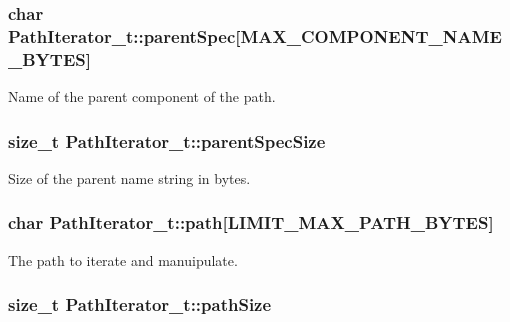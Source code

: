 \subsubsection[{\texorpdfstring{parent\+Spec}{parentSpec}}]{\setlength{\rightskip}{0pt plus 5cm}char Path\+Iterator\+\_\+t\+::parent\+Spec\mbox{[}{\bf M\+A\+X\+\_\+\+C\+O\+M\+P\+O\+N\+E\+N\+T\+\_\+\+N\+A\+M\+E\+\_\+\+B\+Y\+T\+ES}\mbox{]}}\hypertarget{struct_path_iterator__t_a6977e9f920bf2b7a9520754db17e2fc7}{}\label{struct_path_iterator__t_a6977e9f920bf2b7a9520754db17e2fc7}


Name of the parent component of the path. 

\subsubsection[{\texorpdfstring{parent\+Spec\+Size}{parentSpecSize}}]{\setlength{\rightskip}{0pt plus 5cm}size\+\_\+t Path\+Iterator\+\_\+t\+::parent\+Spec\+Size}\hypertarget{struct_path_iterator__t_a7e830a9f2beec716fb0c48d8a2bff45d}{}\label{struct_path_iterator__t_a7e830a9f2beec716fb0c48d8a2bff45d}


Size of the parent name string in bytes. 

\subsubsection[{\texorpdfstring{path}{path}}]{\setlength{\rightskip}{0pt plus 5cm}char Path\+Iterator\+\_\+t\+::path\mbox{[}{\bf L\+I\+M\+I\+T\+\_\+\+M\+A\+X\+\_\+\+P\+A\+T\+H\+\_\+\+B\+Y\+T\+ES}\mbox{]}}\hypertarget{struct_path_iterator__t_a63f175b8f9ef299f6666c9d0644affeb}{}\label{struct_path_iterator__t_a63f175b8f9ef299f6666c9d0644affeb}


The path to iterate and manuipulate. 

\subsubsection[{\texorpdfstring{path\+Size}{pathSize}}]{\setlength{\rightskip}{0pt plus 5cm}size\+\_\+t Path\+Iterator\+\_\+t\+::path\+Size}\hypertarget{struct_path_iterator__t_a03bd2d418970daf4e8fbd67327ed7669}{}\label{struct_path_iterator__t_a03bd2d418970daf4e8fbd67327ed7669}


